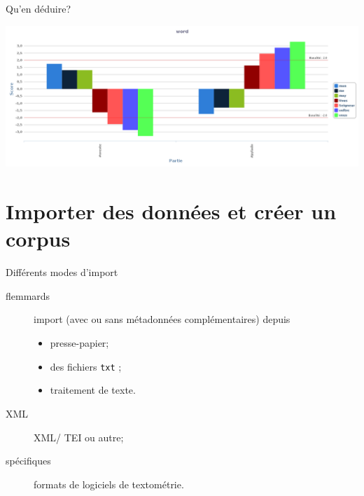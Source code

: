 \documentclass{beamer}
\begin{document}
\begin{frame}{Qu'en déduire?}
	
	\includegraphics[width=\textwidth]{img/graphique_word_Oreste.png}
	
\end{frame}




\section{Importer des données et créer un corpus}

\begin{frame}{Différents modes d'import}
	
	\begin{description}
		\item[flemmards] import (avec ou sans métadonnées complémentaires)
		depuis 
		\begin{itemize}
			\item presse-papier;
			\item des fichiers \texttt{txt} ;
			\item traitement de texte.
		\end{itemize}
		\item[XML] XML/ TEI ou autre;
		\item[spécifiques] formats de logiciels de textométrie.
	\end{description}
	
\end{frame}

\end{document}

